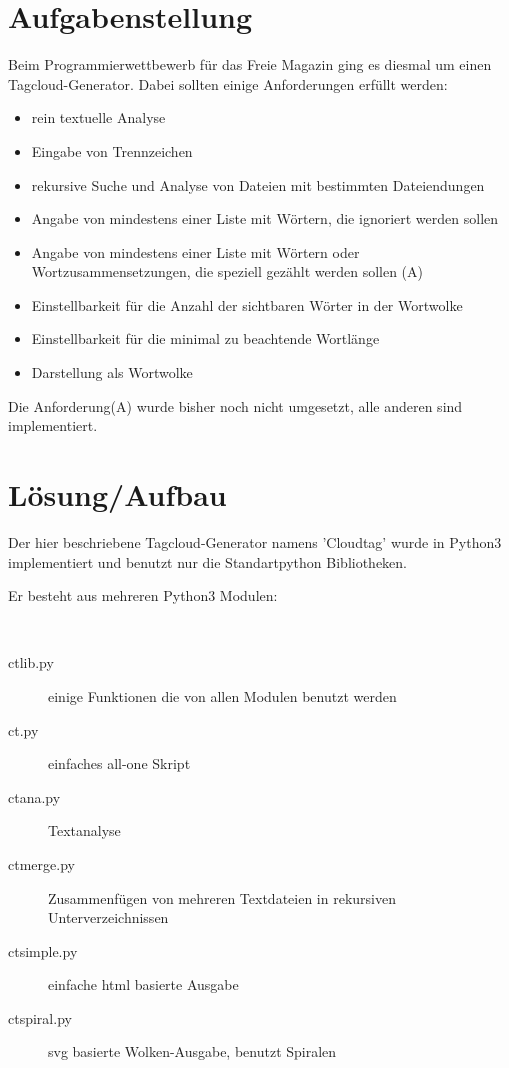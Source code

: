 \section{Aufgabenstellung}
Beim Programmierwettbewerb für das Freie Magazin ging es diesmal um einen
Tagcloud-Generator. 
Dabei sollten einige Anforderungen erfüllt werden:
\begin{itemize}
    \item rein textuelle Analyse
    \item Eingabe von Trennzeichen
    \item rekursive Suche und Analyse von Dateien mit
        bestimmten Dateiendungen
    \item Angabe von mindestens einer Liste mit Wörtern, die ignoriert werden sollen
    \item Angabe von mindestens einer Liste mit Wörtern oder Wortzusammensetzungen, die speziell gezählt werden sollen (A)
    \item Einstellbarkeit für die Anzahl der sichtbaren Wörter in der Wortwolke
    \item Einstellbarkeit für die minimal zu beachtende Wortlänge
    \item Darstellung als Wortwolke
\end{itemize}
Die Anforderung(A) wurde bisher noch nicht umgesetzt, alle anderen sind implementiert.
\section{Lösung/Aufbau}
Der hier beschriebene Tagcloud-Generator namens 'Cloudtag' wurde in Python3 implementiert und benutzt nur die
Standartpython Bibliotheken.


Er besteht aus mehreren Python3 Modulen:
\begin{description}
    \item ~
     \begin{description}
            \item[ctlib.py] einige Funktionen die von allen Modulen benutzt werden
            \item[ct.py] einfaches all-one Skript
            \item[ctana.py] Textanalyse
            \item[ctmerge.py] Zusammenfügen von mehreren Textdateien in rekursiven Unterverzeichnissen
            \item[ctsimple.py] einfache html basierte Ausgabe
            \item[ctspiral.py] svg basierte Wolken-Ausgabe, benutzt Spiralen
        \end{description}
\end{description}


